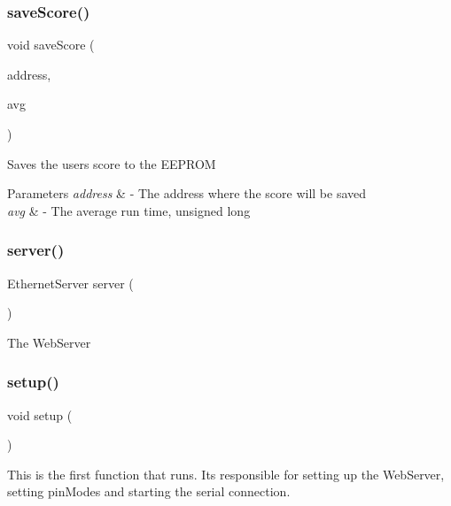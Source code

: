 \subsubsection{\texorpdfstring{saveScore()}{saveScore()}}
{\footnotesize\ttfamily void save\+Score (\begin{DoxyParamCaption}\item[{int}]{address,  }\item[{unsigned long}]{avg }\end{DoxyParamCaption})}

Saves the user\textquotesingle{}s score to the E\+E\+P\+R\+OM 
\begin{DoxyParams}{Parameters}
{\em address} & -\/ The address where the score will be saved \\
\hline
{\em avg} & -\/ The average run time, unsigned long \\
\hline
\end{DoxyParams}
\mbox{\label{test_8ino_acc33ddf5eb1a701fe7fc54e6c558f76b}} 
\subsubsection{\texorpdfstring{server()}{server()}}
{\footnotesize\ttfamily Ethernet\+Server server (\begin{DoxyParamCaption}\item[{\mbox{\hyperlink{test_8ino_af37b150d7960fc164e55cf58aade65a3}{Web\+Server\+Port}}}]{ }\end{DoxyParamCaption})}

The Web\+Server \mbox{\label{test_8ino_a4fc01d736fe50cf5b977f755b675f11d}} 
\subsubsection{\texorpdfstring{setup()}{setup()}}
{\footnotesize\ttfamily void setup (\begin{DoxyParamCaption}{ }\end{DoxyParamCaption})}

This is the first function that runs. It\textquotesingle{}s responsible for setting up the Web\+Server, setting pin\+Modes and starting the serial connection. \mbox{\label{test_8ino_a40fd6d0d758260fb56eda3dcc72a43f0}} 
